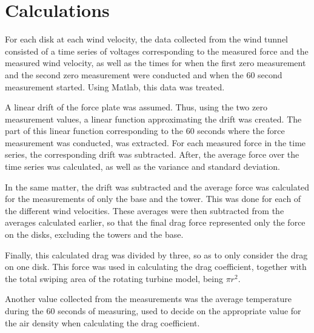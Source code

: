\section{Calculations}

For each disk at each wind velocity, the data collected from the wind tunnel consisted of a time series of voltages corresponding to the measured force and the measured wind velocity, as well as the times for when the first zero measurement and the second zero measurement were conducted and when the 60 second measurement started. Using Matlab, this data was treated.

A linear drift of the force plate was assumed. Thus, using the two zero measurement values, a linear function approximating the drift was created. The part of this linear function corresponding to the 60 seconds where the force measurement was conducted, was extracted. For each measured force in the time series, the corresponding drift was subtracted. After, the average force over the time series was calculated, as well as the variance and standard deviation. 

In the same matter, the drift was subtracted and the average force was calculated for the measurements of only the base and the tower. This was done for each of the different wind velocities. These averages were then subtracted from the averages calculated earlier, so that the final drag force represented only the force on the disks, excluding the towers and the base. 

Finally, this calculated drag was divided by three, so as to only consider the drag on one disk. This force was used in calculating the drag coefficient, together with the total swiping area of the rotating turbine model, being $\pi r^2$.

Another value collected from the measurements was the average temperature during the 60 seconds of measuring, used to decide on the appropriate value for the air density when calculating the drag coefficient. 

